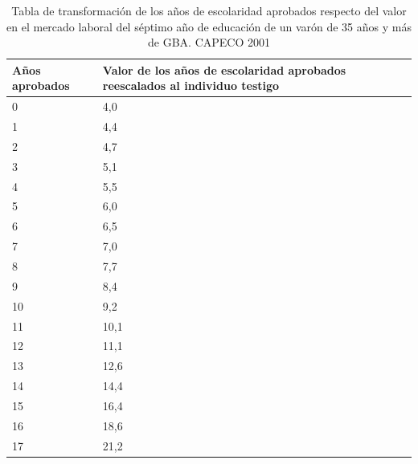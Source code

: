 \begin{table}[h!]
	\small
	\centering
	\caption{Tabla de transformación de los años de escolaridad aprobados respecto del valor en el mercado laboral del séptimo año de educación de un varón de 35 años y más de GBA. CAPECO 2001}
	\label{tab:tableVAE2001}
	\begin{tabular}{p{1cm}|p{3cm}}
		Años aprobados & Valor de los años de escolaridad aprobados
		reescalados al individuo testigo \\
		\hline
		0 & 4,0\\
		\hline
		1 & 4,4\\
		\hline
		2 & 4,7\\
		\hline
		3 & 5,1\\
		\hline
		4 & 5,5\\
		\hline
		5 & 6,0\\
		\hline
		6 & 6,5\\
		\hline
		7 & 7,0\\
		\hline
		8 & 7,7\\
		\hline
		9 & 8,4\\
		\hline
		10 & 9,2\\
		\hline
		11 & 10,1\\
		\hline
		12 & 11,1\\
		\hline
		13 & 12,6\\
		\hline
		14 & 14,4\\
		\hline
		15 & 16,4\\
		\hline
		16 & 18,6\\
		\hline
		17 & 21,2\\
		
	\end{tabular}
\end{table}

